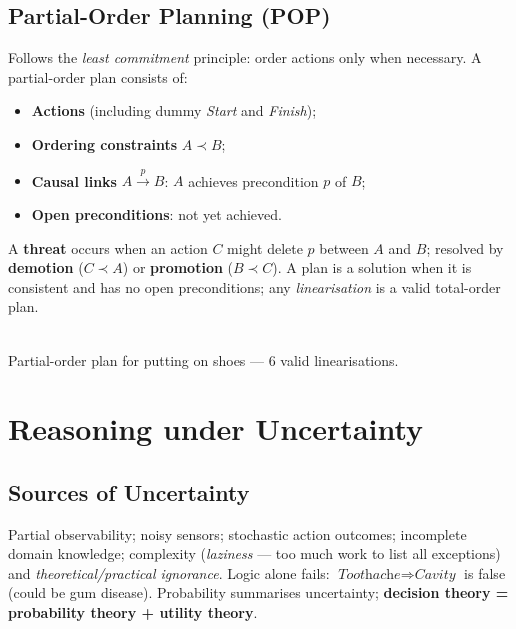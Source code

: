 \subsection{Partial-Order Planning (POP)}
Follows the \emph{least commitment} principle: order actions only when necessary. A partial-order plan consists of:
\begin{itemize}
\item \textbf{Actions} (including dummy \textit{Start} and \textit{Finish});
\item \textbf{Ordering constraints} $A\prec B$;
\item \textbf{Causal links} $A\xrightarrow{p}B$: $A$ achieves precondition $p$ of $B$;
\item \textbf{Open preconditions}: not yet achieved.
\end{itemize}
A \textbf{threat} occurs when an action $C$ might delete $p$ between $A$ and $B$; resolved by \textbf{demotion} ($C\prec A$) or \textbf{promotion} ($B\prec C$). A plan is a solution when it is consistent and has no open preconditions; any \emph{linearisation} is a valid total-order plan.
\begin{center}
\\{\small\color{slate}Partial-order plan for putting on shoes --- 6 valid linearisations.}
\end{center}

\section{Reasoning under Uncertainty}
\subsection{Sources of Uncertainty}
Partial observability; noisy sensors; stochastic action outcomes; incomplete domain knowledge; complexity (\emph{laziness} --- too much work to list all exceptions) and \emph{theoretical/practical ignorance}. Logic alone fails: $\textit{Toothache}\Rightarrow\textit{Cavity}$ is false (could be gum disease). Probability summarises uncertainty; \textbf{decision theory = probability theory + utility theory}.

